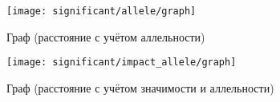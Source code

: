 \documentclass[main.tex]{subfiles}
\begin{document}
\begin{figure}[H]
    \centering \texttt{[image: significant/allele/graph]}
    \caption{Граф (расстояние с учётом аллельности)}
    \label{fig:signif_allele_graph}
\end{figure}

\begin{figure}[H]
    \centering \texttt{[image: significant/impact\_allele/graph]}
    \caption{Граф (расстояние с учётом значимости и аллельности)}
    \label{fig:signif_impact_allele_graph}
\end{figure}
\end{document}
